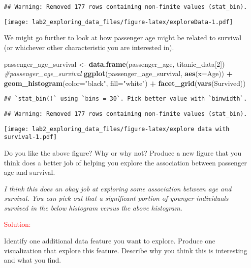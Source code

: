 \documentclass[
]{article}
\newenvironment{Shaded}{\begin{snugshade}}{\end{snugshade}}
\newcommand{\CommentTok}[1]{\textcolor[rgb]{0.56,0.35,0.01}{\textit{#1}}}
\newcommand{\DataTypeTok}[1]{\textcolor[rgb]{0.13,0.29,0.53}{#1}}
\newcommand{\DecValTok}[1]{\textcolor[rgb]{0.00,0.00,0.81}{#1}}
\newcommand{\KeywordTok}[1]{\textcolor[rgb]{0.13,0.29,0.53}{\textbf{#1}}}
\newcommand{\NormalTok}[1]{#1}
\newcommand{\OperatorTok}[1]{\textcolor[rgb]{0.81,0.36,0.00}{\textbf{#1}}}
\newcommand{\StringTok}[1]{\textcolor[rgb]{0.31,0.60,0.02}{#1}}
\begin{document}
\begin{verbatim}
## Warning: Removed 177 rows containing non-finite values (stat_bin).
\end{verbatim}

\texttt{[image: lab2\_exploring\_data\_files/figure-latex/exploreData-1.pdf]}

We might go further to look at how passenger age might be related to
survival (or whichever other characteristic you are interested in).

\begin{Shaded}
\begin{Highlighting}[]
\NormalTok{passenger_age_survival <-}\StringTok{ }\KeywordTok{data.frame}\NormalTok{(passenger_age, titanic_data[}\DecValTok{2}\NormalTok{])}
\CommentTok{#passenger_age_survival}
\KeywordTok{ggplot}\NormalTok{(passenger_age_survival, }\KeywordTok{aes}\NormalTok{(}\DataTypeTok{x=}\NormalTok{Age)) }\OperatorTok{+}\StringTok{ }\KeywordTok{geom_histogram}\NormalTok{(}\DataTypeTok{color=}\StringTok{"black"}\NormalTok{, }\DataTypeTok{fill=}\StringTok{"white"}\NormalTok{) }\OperatorTok{+}\StringTok{ }\KeywordTok{facet_grid}\NormalTok{(}\KeywordTok{vars}\NormalTok{(Survived))}
\end{Highlighting}
\end{Shaded}

\begin{verbatim}
## `stat_bin()` using `bins = 30`. Pick better value with `binwidth`.
\end{verbatim}

\begin{verbatim}
## Warning: Removed 177 rows containing non-finite values (stat_bin).
\end{verbatim}

\texttt{[image: lab2\_exploring\_data\_files/figure-latex/explore data with survival-1.pdf]}

Do you like the above figure? Why or why not? Produce a new figure that
you think does a better job of helping you explore the association
between passenger age and survival.

\emph{I think this does an okay job at exploring some association
between age and survival. You can pick out that a significant portion of
younger individuals survived in the below histogram versus the above
histogram.}

\textcolor{red}{Solution: }\emph{}

Identify one additional data feature you want to explore. Produce one
visualization that explore this feature. Describe why you think this is
interesting and what you find.
\end{document}
